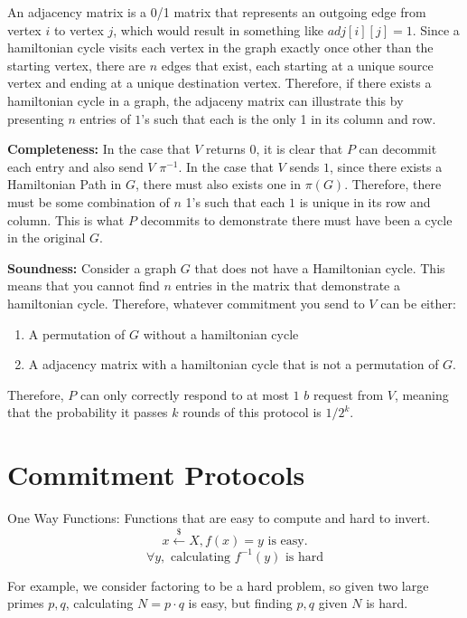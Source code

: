 \documentclass[11pt]{article}
\begin{document}
An adjacency matrix is a 0/1 matrix that represents an outgoing edge from vertex $i$ to vertex $j$, which would result in something like $adj[i][j] = 1$. Since a hamiltonian cycle visits each vertex in the graph exactly once other than the starting vertex, there are $n$ edges that exist, each starting at a unique source vertex and ending at a unique destination vertex. Therefore, if there exists a hamiltonian cycle in a graph, the adjaceny matrix can illustrate this by presenting $n$ entries of $1$'s such that each is the only 1 in its column and row.
\vspace{1em}

\textbf{Completeness:} In the case that $V$ returns $0$, it is clear that $P$ can decommit each entry and also send $V$ $\pi^{-1}$. In the case that $V$ sends $1$, since there exists a Hamiltonian Path in $G$, there must also exists one in $\pi(G)$. Therefore, there must be some combination of $n$ 1's such that each $1$ is unique in its row and column. This is what $P$ decommits to demonstrate there must have been a cycle in the original $G$.
\vspace{1em}

\textbf{Soundness:} Consider a graph $G$ that does not have a Hamiltonian cycle. This means that you cannot find $n$ entries in the matrix that demonstrate a hamiltonian cycle. Therefore, whatever commitment you send to $V$ can be either:
\begin{enumerate}
    \item A permutation of $G$ without a hamiltonian cycle
    \item A adjacency matrix with a hamiltonian cycle that is not a permutation of $G$.
\end{enumerate}
Therefore, $P$ can only correctly respond to at most $1$ $b$ request from $V$, meaning that the probability it passes $k$ rounds of this protocol is $1/2^k$.

\section{Commitment Protocols}
One Way Functions: Functions that are easy to compute and hard to invert.
$$x \overset{\$}{\leftarrow} X, f(x) = y \text{ is easy.}$$
$$\forall y, \text{ calculating } f^{-1}(y) \text{ is hard}$$

For example, we consider factoring to be a hard problem, so given two large primes $p,q$, calculating $N = p \cdot q$ is easy, but finding $p,q$ given $N$ is hard.
\end{document}
